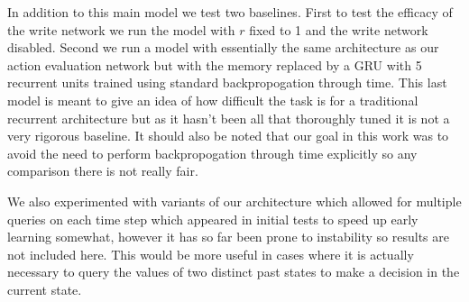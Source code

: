 \documentclass{article}
\begin{document}
In addition to this main model we test two baselines. First to test the efficacy of the write network we run the model with $r$ fixed to 1 and the write network disabled. Second we run a model with essentially the same architecture as our action evaluation network but with the memory replaced by a GRU with 5 recurrent units trained using standard backpropogation through time. This last model is meant to give an idea of how difficult the task is for a traditional recurrent architecture but as it hasn't been all that thoroughly tuned it is not a very rigorous baseline. It should also be noted that our goal in this work was to avoid the need to perform backpropogation through time explicitly so any comparison there is not really fair.

We also experimented with variants of our architecture which allowed for multiple queries on each time step which appeared in initial tests to speed up early learning somewhat, however it has so far been prone to instability so results are not included here. This would be more useful in cases where it is actually necessary to query the values of two distinct past states to make a decision in the current state.
\end{document}
